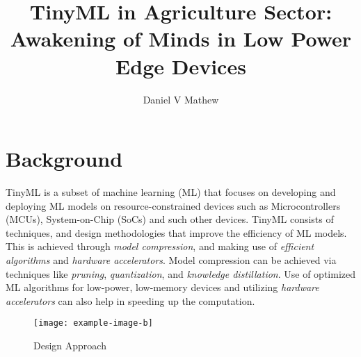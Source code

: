 \documentclass[fleqn,10pt]{wlscirep}
\title{TinyML in Agriculture Sector: Awakening of Minds in Low Power Edge Devices}
\author[]{Daniel V Mathew}
\affil[]{Department of Electronics and Communication, Rajiv Gandhi Institute of Technology, Kottayam, 686501, India}
\begin{document}
\flushbottom
\maketitle
%
%
\thispagestyle{empty}


\section*{Background}
\label{sec:background}

    TinyML is a subset of machine learning (ML) that focuses on developing and deploying
    ML models on resource-constrained devices such as Microcontrollers (MCUs), System-on-Chip
    (SoCs) and such other devices. TinyML consists of techniques, and design methodologies
    that improve the efficiency of ML models. This is achieved through \emph{model compression},
    and making use of \emph{efficient algorithms} and \emph{hardware accelerators}.
    Model compression can be achieved via techniques like \emph{pruning}, \emph{quantization},
    and \emph{knowledge distillation}. Use of optimized ML algorithms for low-power, low-memory devices
    and utilizing \emph{hardware accelerators} can also help in speeding up the computation.

%
\begin{figure} [h]
 \begin{center}

\label{fig:design}
 \texttt{[image: example-image-b]}
 \caption{Design Approach}
 \label{fig:design}
 \end{center}
\end{figure}
\end{document}
